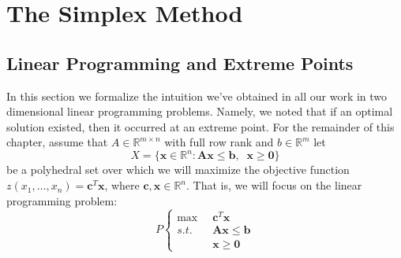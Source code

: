 \chapter{The Simplex Method}
\section{Linear Programming and Extreme Points}
In this section we formalize the intuition we've obtained in all our work in two dimensional linear programming problems. Namely, we noted that if an optimal solution existed, then it occurred at an extreme point. For the remainder of this chapter, assume that $A \in \mathbb{R}^{m \times n}$ with full row rank and $b \in \mathbb{R}^m$ let
\begin{equation}
X = \{\mathbf{x} \in \mathbb{R}^n : \mathbf{A}\mathbf{x} \leq \mathbf{b},\;\;\mathbf{x} \geq \mathbf{0}\}
\end{equation}
be a polyhedral set over which we will maximize the objective function $z(x_1,\dots,x_n) = \mathbf{c}^T\mathbf{x}$, where $\mathbf{c},\mathbf{x} \in \mathbb{R}^n$. That is, we will focus on the linear programming problem:
\begin{equation}P\left\{
\begin{aligned}
\max\;\;&\mathbf{c}^T\mathbf{x}\\
s.t.\;\;&\mathbf{A}\mathbf{x} \leq \mathbf{b}\\
& \mathbf{x} \geq \mathbf{0}
\end{aligned}\right.
\end{equation}

